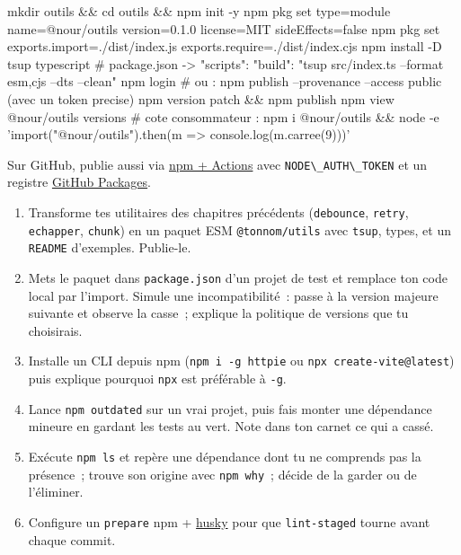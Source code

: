 \documentclass[12pt,a4paper,twoside,openright]{book}
\newcommand{\link}[2]{\href{#2}{#1}}
\begin{document}
\begin{terminal}
mkdir outils && cd outils && npm init -y
npm pkg set type=module name=@nour/outils version=0.1.0 license=MIT sideEffects=false
npm pkg set exports.import=./dist/index.js exports.require=./dist/index.cjs
npm install -D tsup typescript
# package.json -> "scripts": { "build": "tsup src/index.ts --format esm,cjs --dts --clean" }
npm login          # ou : npm publish --provenance --access public (avec un token precise)
npm version patch && npm publish
npm view @nour/outils versions
# cote consommateur :
npm i @nour/outils && node -e 'import("@nour/outils").then(m => console.log(m.carree(9)))'
\end{terminal}

Sur GitHub, publie aussi via \link{npm + Actions}{https://docs.github.com/en/actions/publishing-packages/publishing-nodejs-packages}
avec \verb|NODE\_AUTH\_TOKEN| et un registre \link{GitHub Packages}{https://github.com/features/packages}.

\begin{exercice}
\begin{enumerate}
  \item Transforme tes utilitaires des chapitres pr\'ec\'edents (\verb|debounce|, \verb|retry|,
        \verb|echapper|, \verb|chunk|) en un paquet ESM \verb|@tonnom/utils| avec
        \verb|tsup|, types, et un \verb|README| d'exemples. Publie-le.
  \item Mets le paquet dans \verb|package.json| d'un projet de test et remplace ton code
        local par l'import. Simule une incompatibilit\'e~: passe \`a la version majeure suivante et
        observe la casse~; explique la politique de versions que tu choisirais.
  \item Installe un CLI depuis npm (\verb|npm i -g httpie| ou \verb|npx create-vite@latest|) puis
        explique pourquoi \verb|npx| est pr\'ef\'erable \`a \verb|-g|.
  \item Lance \verb|npm outdated| sur un vrai projet, puis fais monter une d\'ependance mineure
        en gardant les tests au vert. Note dans ton carnet ce qui a cass\'e.
  \item Ex\'ecute \verb|npm ls| et rep\`ere une d\'ependance dont tu ne comprends pas la pr\'esence~;
        trouve son origine avec \verb|npm why|~; d\'ecide de la garder ou de l'\'eliminer.
  \item Configure un \verb|prepare| npm + \link{husky}{https://typicode.github.io/husky/}
        pour que \verb|lint-staged| tourne avant chaque commit.
\end{enumerate}
\end{exercice}
\end{document}
